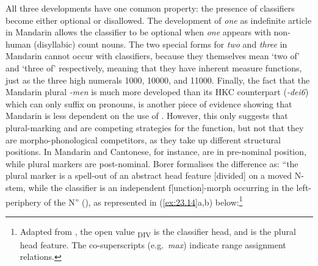 \documentclass[output=paper]{langsci/langscibook}
\begin{document}
All three developments have one common property: the presence of classifiers
become either optional or disallowed. The development of \emph{one} as
indefinite article in Mandarin allows the classifier to be optional when
\emph{one} appears with non-human (disyllabic) count nouns. The two special
forms for \emph{two} and \emph{three} in Mandarin cannot occur with
classifiers, because they themselves mean ‘two of’ and ‘three of’ respectively,
meaning that they have inherent measure functions, just as the three high
numerals 1000, 10000, and 11000. Finally, the fact that the Mandarin plural
\emph{-men} is much more developed than its \gls{HKC} counterpart
(\emph{-dei6}) which can only suffix on pronouns, is another piece of evidence
showing that Mandarin  is less dependent on the use of .
However, this only suggests that plural-marking and  are competing
strategies for the  function, but not that they are
morpho-phonological competitors, as they take up different structural
positions. In Mandarin and Cantonese, for instance,  are in
pre-nominal position, while plural markers are post-nominal. Borer formalises
the difference as: “the plural marker is a spell-out of an abstract head
feature  [divided] on a moved N-stem, while the
classifier is an independent f[unction]-morph occurring in the
left-periphery of the N” (\citeyear[95]{Borer2005}), as represented in\largerpage
(\ref{ex:23.14}a,b)
below:\footnote{Adapted from \citet[95]{Borer2005}, the open value
    \textsubscript{DIV} is the classifier head, and
 is the plural head feature. The co-superscripts (e.g.\ \emph{max})
indicate range assignment relations.}\pagebreak
\end{document}
